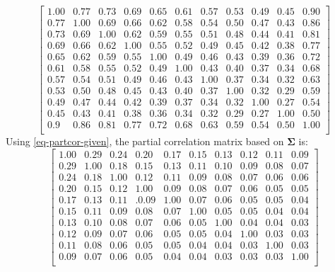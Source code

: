 \documentclass[a4paper]{article}
\def\sigb{{\boldsymbol{\Sigma}}}
\begin{document}
$$
\begin{bmatrix}
1.00 & 0.77 & 0.73 & 0.69 & 0.65  & 0.61 & 0.57 & 0.53 & 0.49 & 0.45 & 0.90\\
0.77 & 1.00 & 0.69  & 0.66  & 0.62 & 0.58 & 0.54 & 0.50 & 0.47 &  0.43 & 0.86\\
0.73 & 0.69 & 1.00 & 0.62 & 0.59  & 0.55 & 0.51 & 0.48 &  0.44 &  0.41 & 0.81\\
0.69 & 0.66 & 0.62&  1.00 & 0.55  & 0.52   & 0.49 &  0.45  & 0.42  & 0.38 & 0.77\\
0.65 & 0.62 & 0.59 & 0.55  & 1.00&  0.49&  0.46 & 0.43 & 0.39 & 0.36 & 0.72\\
0.61  & 0.58 &  0.55 &  0.52 & 0.49 & 1.00 & 0.43 & 0.40 & 0.37 &  0.34 & 0.68\\
0.57 & 0.54  & 0.51  & 0.49 & 0.46 & 0.43 & 1.00  & 0.37  &0.34  & 0.32 & 0.63\\
0.53 & 0.50 & 0.48 & 0.45 & 0.43 & 0.40 & 0.37& 1.00 & 0.32 & 0.29 & 0.59\\
0.49 & 0.47 & 0.44 & 0.42 & 0.39 & 0.37&  0.34  & 0.32 &  1.00  & 0.27 & 0.54\\
0.45 &  0.43  & 0.41 & 0.38  & 0.36 & 0.34&  0.32 & 0.29  &0.27 &  1.00 & 0.50\\
0.9 & 0.86  & 0.81   & 0.77  & 0.72  & 0.68 
& 0.63 & 0.59 & 0.54  &  0.50 & 1.00\\
\end{bmatrix}$$
Using \eqref{eq-partcor-given}, the partial correlation matrix based on $\sigb$ is:
$$\begin{bmatrix}
1.00 & 0.29  & 0.24  & 0.20 & 0.17  & 0.15 & 0.13 & 0.12  & 0.11   & 0.09\\
0.29 & 1.00  & 0.18  & 0.15  & 0.13  & 0.11 & 0.10   & 0.09  & 0.08  & 0.07 \\
0.24 & 0.18 & 1.00  & 0.12 & 0.11 & 0.09 & 0.08 & 0.07 & 0.06  & 0.06\\
0.20 & 0.15 & 0.12  &1.00  &0.09 & 0.08 & 0.07 & 0.06 & 0.05 & 0.05\\
0.17 & 0.13  & 0.11 &. 0.09 & 1.00 & 0.07 & 0.06 & 0.05 & 0.05 &  0.04\\
0.15 & 0.11 &0.09 &0.08& 0.07& 1.00& 0.05& 0.05& 0.04  &0.04\\
 0.13 & 0.10  & 0.08 & 0.07  &0.06 & 0.05&  1.00 & 0.04  &0.04   &0.03\\
 0.12 & 0.09  & 0.07  & 0.06  & 0.05  & 0.05  & 0.04&  1.00 & 0.03 &  0.03\\
 0.11 & 0.08 & 0.06  &0.05 & 0.05 & 0.04 & 0.04 & 0.03  &1.00 &  0.03\\
 0.09  & 0.07 & 0.06  &0.05 &0.04 & 0.04&  0.03&  0.03 & 0.03 &  1.00\\
\end{bmatrix}
$$
\end{document}
